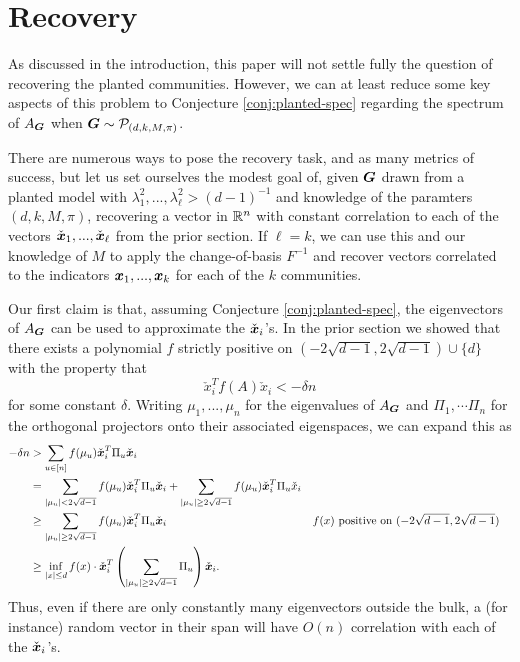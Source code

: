 \section{Recovery} %
\label{sec:recovery}

As discussed in the introduction, this paper will not settle fully the question of recovering the planted communities. However, we can at least reduce some key aspects of this problem to Conjecture \ref{conj:planted-spec} regarding the spectrum of $A_{\boldsymbol{G}}$ when $\boldsymbol{G} \sim \mathcal{P}_{(d,k,M,\pi)}$.

There are numerous ways to pose the recovery task, and as many metrics of success, but let us set ourselves the modest goal of, given $\boldsymbol{G}$ drawn from a planted model with $\lambda_1^2,...,\lambda_\ell^2 > (d-1)^{-1}$ and knowledge of the paramters $(d,k,M,\pi)$, recovering a vector in $\mathbb{R}^n$ with constant correlation to each of the vectors $\check {{\boldsymbol{x}}}_1,...,\check {{\boldsymbol{x}}}_\ell$ from the prior section. If $\ell = k$, we can use this and our knowledge of $M$ to apply the change-of-basis $F^{-1}$ and recover vectors correlated to the indicators ${\boldsymbol{x}}_1,...,{\boldsymbol{x}}_k$ for each of the $k$ communities. 

Our first claim is that, assuming Conjecture \ref{conj:planted-spec}, the eigenvectors of $A_{\boldsymbol{G}}$ can be used to approximate the $\check {{\boldsymbol{x}}}_i$'s. In the prior section we showed that there exists a polynomial $f$ strictly positive on $(-2\sqrt{d-1},2\sqrt{d-1}) \cup \{d\}$ with the property that
$$
	\check x_i^T f(A) \check x_i < -\delta n
$$
for some constant $\delta$. Writing $\mu_1,...,\mu_n$ for the eigenvalues of $A_{\boldsymbol{G}}$ and $\Pi_1, \cdots \Pi_n$ for the orthogonal projectors onto their associated eigenspaces, we can expand this as
\begin{align*}
	-\delta n &> \sum_{u \in [n]} f(\mu_u) \check {{\boldsymbol{x}}}_i^T \Pi_u \check {{\boldsymbol{x}}}_i \\
	&= \sum_{|\mu_u| < 2\sqrt{d-1}}f(\mu_u) \check {{\boldsymbol{x}}}_i^T \Pi_u \check {{\boldsymbol{x}}}_i + \sum_{|\mu_u| \ge 2\sqrt{d-1}}f(\mu_u) \check {{\boldsymbol{x}}}_i^T \Pi_u \check x_i \\
	&\ge \sum_{|\mu_u| \ge 2\sqrt{d-1}}f(\mu_u) \check {{\boldsymbol{x}}}_i^T \Pi_u \check {{\boldsymbol{x}}}_i & & f(x) \text{ positive on $(-2\sqrt{d-1},2\sqrt{d-1})$} \\
	&\ge \inf_{|x| \le d}f(x) \cdot \check {{\boldsymbol{x}}}_i^T \left(\sum_{|\mu_u| \ge 2\sqrt{d-1}} \Pi_u \right) \check {{\boldsymbol{x}}}_i.
\end{align*}
Thus, even if there are only constantly many eigenvectors outside the bulk, a (for instance) random vector in their span will have $O(n)$ correlation with each of the $\check {{\boldsymbol{x}}}_i$'s.


